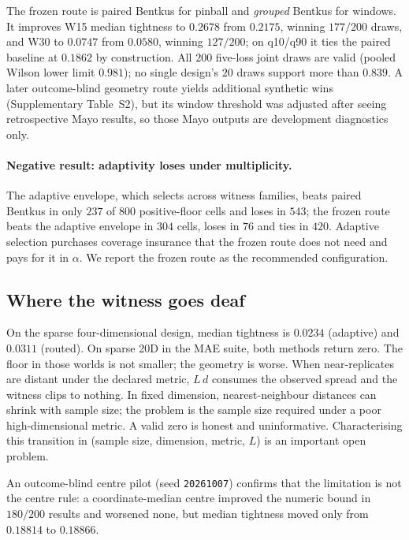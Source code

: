 \documentclass[11pt]{article}
\theoremstyle{definition}
\begin{document}
The frozen route is paired Bentkus for pinball and \emph{grouped} Bentkus for windows. It improves W15 median tightness to $0.2678$ from $0.2175$, winning $177/200$ draws, and W30 to $0.0747$ from $0.0580$, winning $127/200$; on q10/q90 it ties the paired baseline at $0.1862$ by construction. All $200$ five-loss joint draws are valid (pooled Wilson lower limit $0.981$); no single design's $20$ draws support more than $0.839$. A later outcome-blind geometry route yields additional synthetic wins (Supplementary Table~S2), but its window threshold was adjusted after seeing retrospective Mayo results, so those Mayo outputs are development diagnostics only.

\paragraph{Negative result: adaptivity loses under multiplicity.} The adaptive envelope, which selects across witness families, beats paired Bentkus in only $237$ of $800$ positive-floor cells and loses in $543$; the frozen route beats the adaptive envelope in $304$ cells, loses in $76$ and ties in $420$. Adaptive selection purchases coverage insurance that the frozen route does not need and pays for it in $\alpha$. We report the frozen route as the recommended configuration.

\subsection{Where the witness goes deaf}

On the sparse four-dimensional design, median tightness is $0.0234$ (adaptive) and $0.0311$ (routed). On sparse 20D in the MAE suite, both methods return zero. The floor in those worlds is not smaller; the geometry is worse. When near-replicates are distant under the declared metric, $L\,d$ consumes the observed spread and the witness clips to nothing. In fixed dimension, nearest-neighbour distances can shrink with sample size; the problem is the sample size required under a poor high-dimensional metric. A valid zero is honest and uninformative. Characterising this transition in (sample size, dimension, metric, $L$) is an important open problem.

An outcome-blind centre pilot (seed \texttt{20261007}) confirms that the limitation is not the centre rule: a coordinate-median centre improved the numeric bound in $180/200$ results and worsened none, but median tightness moved only from $0.18814$ to $0.18866$.
\end{document}
